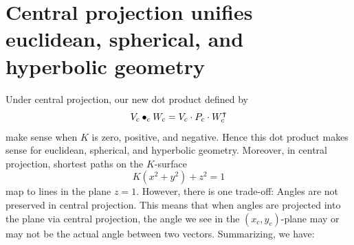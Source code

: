 \documentclass{ximera}
\begin{document}
\section{Central projection unifies euclidean, spherical, and hyperbolic geometry}

Under central projection, our new dot product defined by
\[
V_c\bullet_c W_c = V_c\cdot P_c\cdot W_c^\intercal
\]
make sense when $K$ is zero, positive, and negative. Hence this dot
product makes sense for euclidean, spherical, and hyperbolic
geometry. Moreover, in central projection, shortest paths on the $K$-surface
\[
K\left(x^2 + y^2\right) + z^2 = 1
\]
map to lines in the plane $z=1$. However, there is one trade-off:
Angles are not preserved in central projection. This means that when
angles are projected into the plane via central projection, the angle
we see in the $(x_c,y_c)$-plane may or may not be the actual angle
between two vectors. Summarizing, we have:
\end{document}
